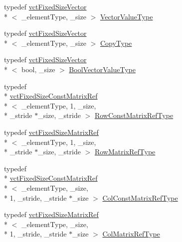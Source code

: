 \begin{DoxyCompactItemize}
\item 
typedef \hyperlink{classvct_fixed_size_vector}{vct\-Fixed\-Size\-Vector}\\*
$<$ \-\_\-element\-Type, \-\_\-size $>$ \hyperlink{classvct_fixed_size_const_vector_base_a4de94a741a6bb9046e05754c32475ecd}{Vector\-Value\-Type}
\item 
typedef \hyperlink{classvct_fixed_size_vector}{vct\-Fixed\-Size\-Vector}\\*
$<$ \-\_\-element\-Type, \-\_\-size $>$ \hyperlink{classvct_fixed_size_const_vector_base_aaf3accb7cec5765478b5d8fa39c22408}{Copy\-Type}
\item 
typedef \hyperlink{classvct_fixed_size_vector}{vct\-Fixed\-Size\-Vector}\\*
$<$ bool, \-\_\-size $>$ \hyperlink{classvct_fixed_size_const_vector_base_a15899465a75a2f78965bdcf2d6e34bc5}{Bool\-Vector\-Value\-Type}
\end{DoxyCompactItemize}
{\bf }\par
\begin{DoxyCompactItemize}
\item 
typedef \\*
\hyperlink{classvct_fixed_size_const_matrix_ref}{vct\-Fixed\-Size\-Const\-Matrix\-Ref}\\*
$<$ \-\_\-element\-Type, 1, \-\_\-size, \\*
\-\_\-stride $\ast$\-\_\-size, \-\_\-stride $>$ \hyperlink{classvct_fixed_size_const_vector_base_ab7c118dbf79db9194157ced0e4549814}{Row\-Const\-Matrix\-Ref\-Type}
\item 
typedef \hyperlink{classvct_fixed_size_matrix_ref}{vct\-Fixed\-Size\-Matrix\-Ref}\\*
$<$ \-\_\-element\-Type, 1, \-\_\-size, \\*
\-\_\-stride $\ast$\-\_\-size, \-\_\-stride $>$ \hyperlink{classvct_fixed_size_const_vector_base_a1f9ff7c6b2b3f98c51d1bf3eefdfbd32}{Row\-Matrix\-Ref\-Type}
\end{DoxyCompactItemize}

{\bf }\par
\begin{DoxyCompactItemize}
\item 
typedef \\*
\hyperlink{classvct_fixed_size_const_matrix_ref}{vct\-Fixed\-Size\-Const\-Matrix\-Ref}\\*
$<$ \-\_\-element\-Type, \-\_\-size, \\*
1, \-\_\-stride, \-\_\-stride $\ast$\-\_\-size $>$ \hyperlink{classvct_fixed_size_const_vector_base_a7dd213f3b90969b8c89fd0766cf0a70e}{Col\-Const\-Matrix\-Ref\-Type}
\item 
typedef \hyperlink{classvct_fixed_size_matrix_ref}{vct\-Fixed\-Size\-Matrix\-Ref}\\*
$<$ \-\_\-element\-Type, \-\_\-size, \\*
1, \-\_\-stride, \-\_\-stride $\ast$\-\_\-size $>$ \hyperlink{classvct_fixed_size_const_vector_base_ac2454662f16abd75fdef4ce8d2a00a48}{Col\-Matrix\-Ref\-Type}
\end{DoxyCompactItemize}


